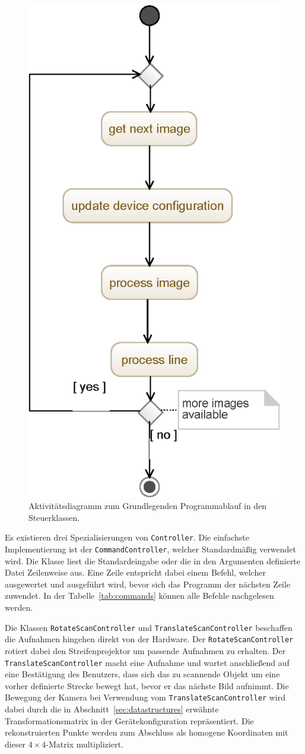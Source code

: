 \documentclass[ngerman,a4paper,parskip=half]{scrartcl}
\begin{document}
\begin{figure}
	\centering
	\includegraphics[width=0.4\linewidth]{includes/software_controller}
	\caption{Aktivitätsdiagramm zum Grundlegenden Programmablauf in den Steuerklassen.}
	\label{fig:software_controller}
\end{figure}

Es existieren drei Spezialisierungen von \texttt{Controller}. Die einfachste Implementierung ist der \texttt{CommandController}, welcher Standardmäßig verwendet wird. Die Klasse liest die Standardeingabe oder die in den Argumenten definierte Datei Zeilenweise aus. Eine Zeile entspricht dabei einem Befehl, welcher ausgewertet und ausgeführt wird, bevor sich das Programm der nächsten Zeile zuwendet. In der Tabelle~\ref{tab:commands} können alle Befehle nachgelesen werden.

Die Klassen \texttt{RotateScanController} und \texttt{TranslateScanController} beschaffen die Aufnahmen hingehen direkt von der Hardware. Der \texttt{RotateScanController} rotiert dabei den Streifenprojektor um passende Aufnahmen zu erhalten. Der \texttt{TranslateScanController} macht eine Aufnahme und wartet anschließend auf eine Bestätigung des Benutzers, dass sich das zu scannende Objekt um eine vorher definierte Strecke bewegt hat, bevor er das nächste Bild aufnimmt.
Die Bewegung der Kamera bei Verwendung vom \texttt{TranslateScanController} wird dabei durch die in Abschnitt~\ref{sec:datastructures} erwähnte Transformationsmatrix in der Gerätekonfiguration repräsentiert. Die rekonstruierten Punkte werden zum Abschluss als homogene Koordinaten mit dieser $4 \times 4$-Matrix multipliziert.
\end{document}
